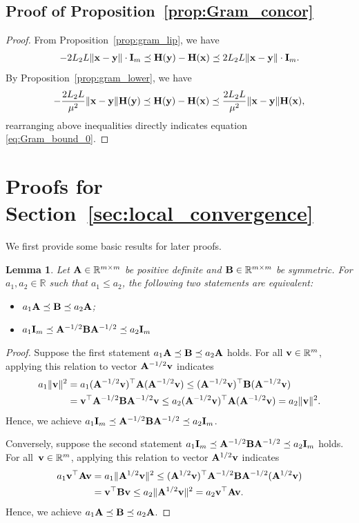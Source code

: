\documentclass[11pt]{article}
\theoremstyle{plain}
\newtheorem{lemma}[theorem]{Lemma}
\theoremstyle{definition}
\theoremstyle{remark}
\theoremstyle{plain}
\def\BR{{\mathbb{R}}}
\def\BR{{\mathbb{R}}}
\def\A{{\bf A}}
\def\B{{\bf B}}
\def\H{{\bf H}}
\def\I{{\bf I}}
\def\v{{\bf v}}
\def\x{{\bf x}}
\def\y{{\bf y}}
\begin{document}
\subsection{Proof of Proposition~\ref{prop:Gram_concor}}
\label{app:proof_prop_gram_concordance}
\begin{proof}
From Proposition~\ref{prop:gram_lip}, we have
    \begin{align*}
    -2L_2L \|\x-\y\|\cdot\I_m \preceq   \H(\y)-\H(\x)\preceq 2L_2L \|\x-\y\|\cdot\I_m.
    \end{align*}
    By Proposition~\ref{prop:gram_lower}, we have
    \begin{align*}
     -\frac{2L_2L}{\mu^2}\|
    \x-\y\| \H(\y)\preceq   \H(\y)-\H(\x)\preceq \frac{2L_2L}{\mu^2}\|\x-\y\|\H(\x),
    \end{align*}
    rearranging above inequalities directly indicates equation \eqref{eq:Gram_bound_0}.
\end{proof}

\section{Proofs for Section~\ref{sec:local_convergence}}
\label{app:proofs}
We first provide some basic results for later proofs.

\begin{lemma}
\label{lm:matrix_order_equivalence}
Let $\A\in\BR^{m\times m}$ be positive definite and
$\B\in\BR^{m\times m}$ be symmetric.
For $a_1,a_2\in\BR$ such that $a_1\leq a_2$, the following two statements are equivalent: 
\begin{itemize}
\item $a_1\A\preceq\B\preceq a_2\A$;
\item $a_1\I_m\preceq\A^{-1/2}\B\A^{-1/2}\preceq a_2\I_m$
\end{itemize}
\end{lemma}
\begin{proof}
Suppose the first statement $a_1\A\preceq\B\preceq a_2\A$ holds.
For all $\v\in\BR^m$, applying this relation to vector $\A^{-1/2}\v$ indicates
\begin{align*}
a_1\|\v\|^2
&=a_1(\A^{-1/2}\v)^{\top}\A(\A^{-1/2}\v)\leq
(\A^{-1/2}\v)^{\top}\B(\A^{-1/2}\v)\\
&=\v^{\top}\A^{-1/2}\B\A^{-1/2}\v
\leq a_2(\A^{-1/2}\v)^{\top}\A(\A^{-1/2}\v)
=a_2\|\v\|^2.
\end{align*}
Hence, we achieve $a_1\I_m\preceq\A^{-1/2}\B\A^{-1/2}\preceq a_2\I_m$.

Conversely, suppose the second statement
$a_1\I_m\preceq\A^{-1/2}\B\A^{-1/2}\preceq a_2\I_m$ holds.
For all~$\v\in\BR^m$, applying this relation to vector $\A^{1/2}\v$ indicates
\begin{align*}
a_1\v^{\top}\A\v
&=a_1\|\A^{1/2}\v\|^2
\leq(\A^{1/2}\v)^{\top}\A^{-1/2}\B\A^{-1/2}(\A^{1/2}\v)\\
&=\v^{\top}\B\v
\leq a_2\|\A^{1/2}\v\|^2
=a_2\v^{\top}\A\v.
\end{align*}
Hence, we achieve
$a_1\A\preceq\B\preceq a_2\A$.
\end{proof}
\end{document}
